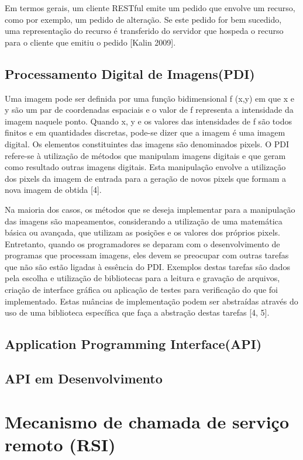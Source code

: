\documentclass[12pt]{article}
\begin{document}
Em termos gerais, um cliente RESTful emite um pedido que envolve um recurso, como
por exemplo, um pedido de alteração. Se este pedido for bem sucedido, uma representação
do recurso é transferido do servidor que hospeda o recurso para o cliente que emitiu o
pedido [Kalin 2009].


\subsection{Processamento Digital de Imagens(PDI)}

Uma imagem pode ser definida por uma função bidimensional f (x,y) em que x e y são um par de coordenadas espaciais e o valor de f representa a intensidade da
imagem naquele ponto. Quando x, y e os valores das intensidades de f são todos finitos e em quantidades discretas, pode-se dizer que a imagem é uma imagem
digital. Os elementos constituintes das imagens são denominados pixels. O PDI refere-se à utilização de métodos que manipulam imagens digitais e que geram
como resultado outras imagens digitais. Esta manipulação envolve a utilização dos pixels da imagem de entrada para a geração de novos pixels que formam a
nova imagem de obtida [4].

Na maioria dos casos, os métodos que se deseja implementar para a manipulação das imagens são mapeamentos, considerando a utilização de uma matemática
básica ou avançada, que utilizam as posições e os valores dos próprios pixels. Entretanto, quando os programadores se deparam com o desenvolvimento de
programas que processam imagens, eles devem se preocupar com outras tarefas que não são estão ligadas à essência do PDI. Exemplos destas tarefas são dados
pela escolha e utilização de bibliotecas para a leitura e gravação de arquivos, criação de interface gráfica ou aplicação de testes para verificação do que foi
implementado. Estas nuâncias de implementação podem ser abstraídas através do uso de uma biblioteca específica que faça a abstração destas tarefas [4, 5].

\subsection{Application Programming Interface(API)}

\subsection{API em Desenvolvimento}


\section{Mecanismo de chamada de serviço remoto (RSI)}
\end{document}
